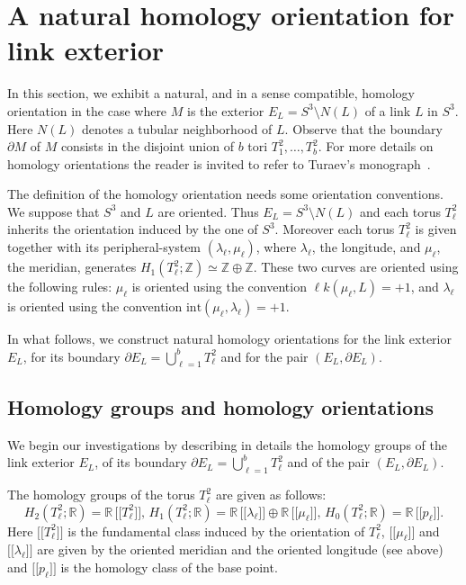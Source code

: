 \documentclass[a4paper]{amsart}
\theoremstyle{plain}
\theoremstyle{definition}
\theoremstyle{remark}
\newcommand{\ZZ}{{\mathbb Z}}
\newcommand{\IR}{{\mathbb R}}
\newcommand{\bbrack}[1]{\lbrack \! \lbrack #1 \rbrack \! \rbrack}
\newcommand{\lk}{\ell\mathit{k}}
\newcommand{\bord}{\partial}
\begin{document}
\appendix


\section{A natural homology orientation for  link exterior}
\label{section:link_orientation}

In this section, we exhibit a natural, and in a sense compatible,
homology orientation in the case where $M$ is the exterior $E_L = S^3
\setminus N(L)$ of a link $L$ in $S^3$. Here $N(L)$ denotes a tubular
neighborhood of $L$. Observe that the boundary $\bord M$ of $M$
consists in the disjoint union of $b$ tori $T^2_1, \ldots, T^2_b$. For more details on homology orientations the reader is invited to refer to Turaev's monograph~\cite{Turaev:2002}.
	
The definition of the homology orientation needs some orientation
conventions. We suppose that $S^3$ and $L$ are oriented. 
Thus $E_L = S^3 \setminus N(L)$ and each torus $T^2_\ell$ inherits the orientation
induced by the one of $S^3$. Moreover each torus $T^2_\ell$ is given
together with its peripheral-system $(\lambda_\ell, \mu_\ell)$, where
$\lambda_\ell$, the longitude, and $\mu_\ell$, the meridian, generates
$H_1(T^2_\ell; \ZZ)\simeq \ZZ \oplus \ZZ$. These two curves are oriented using the following
rules: $\mu_\ell$ is oriented using the convention 
$\lk (\mu_\ell, L) = +1$, and $\lambda_\ell$ is oriented using the convention
$\mathrm{int}(\mu_\ell, \lambda_\ell) = +1$.

In what follows, we construct natural homology orientations for the
link exterior $E_L$, for its boundary $\bord E_L = \bigcup_{\ell = 1}^b T^2_\ell $ and 
for the pair $(E_L, \bord E_L)$. 
	
\subsection{Homology groups and homology orientations}
\label{A:1}

We begin our investigations by describing in details the homology
groups of the link exterior $E_L$, of its boundary 
$\bord E_L = \bigcup_{\ell = 1}^b T^2_\ell $ and of the pair $(E_L, \bord E_L)$.

The homology groups of the torus $T^2_\ell$ are given as follows:
$$
H_2(T^2_\ell;\IR) = \IR \, \bbrack{T^2_\ell},\,
H_1(T^2_\ell;\IR) = \IR \, \bbrack{\lambda_\ell} \oplus \IR \, \bbrack{\mu_\ell},\,
H_0(T^2_\ell;\IR) = \IR \, \bbrack{p_\ell}.
$$
Here $\bbrack{T^2_\ell}$ is the fundamental class induced by the orientation of
$T^2_\ell$, $\bbrack{\mu_\ell}$ and $\bbrack{\lambda_\ell}$ are given by the oriented
meridian and the oriented longitude (see above) and $\bbrack{p_\ell}$ is the
homology class of the base point.
\end{document}
